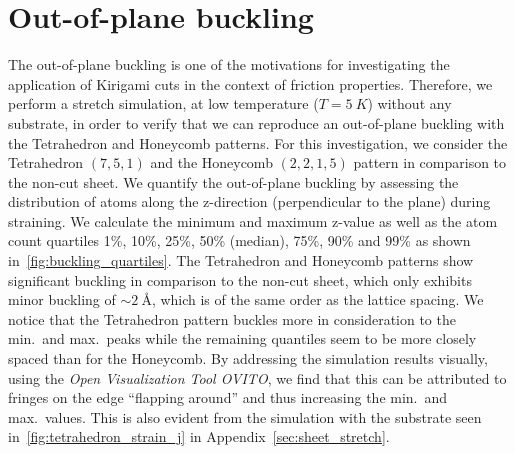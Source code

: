 \section{Out-of-plane buckling}\label{sec:out-of-plane_buckling}
The out-of-plane buckling is one of the motivations for investigating
the application of Kirigami cuts in the context of friction properties. Therefore, we perform a stretch simulation, at low temperature ($T = \SI{5}{K}$) without any substrate, in order to verify that we can reproduce an out-of-plane buckling with the Tetrahedron and Honeycomb patterns. For this investigation, we consider the Tetrahedron $(7,5,1)$ and the Honeycomb $(2,2,1,5)$ pattern in comparison to the non-cut sheet. We quantify the out-of-plane buckling by assessing the distribution of atoms along the z-direction (perpendicular to the plane) during straining. We calculate the
minimum and maximum z-value as well as the atom count quartiles 1\%, 10\%, 25\%, 50\% (median), 75\%, 90\% and 99\% as shown in~\cref{fig:buckling_quartiles}. The Tetrahedron and Honeycomb patterns show significant buckling in comparison to the non-cut sheet, which only exhibits minor buckling of $\sim \SI{2}{\text{Å}}$, which is of the same order as the lattice spacing. We notice that the Tetrahedron pattern buckles more in consideration to the min.\ and max.\ peaks while the remaining quantiles seem to be more closely spaced than for the Honeycomb. By addressing the simulation results visually, using the \textit{Open Visualization Tool OVITO}, we find that this can be attributed to fringes on the edge ``flapping around'' and thus increasing the min.\ and max.\ values. This is also evident from the simulation with the substrate seen in~\cref{fig:tetrahedron_strain_j} in Appendix~\cref{sec:sheet_stretch}.


